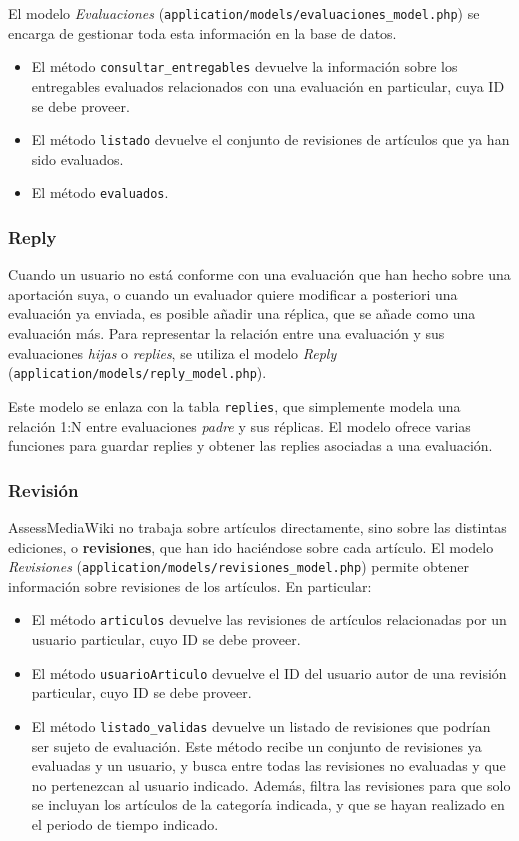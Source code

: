 \documentclass[11pt]{article}
\begin{document}
El modelo \textit{Evaluaciones}
(\texttt{application/models/evaluaciones\_model.php}) se encarga de gestionar
toda esta información en la base de datos. 

\begin{itemize}
\item El método \texttt{consultar\_entregables} devuelve la información sobre
  los entregables evaluados relacionados con una evaluación en particular, cuya
  ID se debe proveer.
\item El método \texttt{listado} devuelve el conjunto de revisiones de artículos
  que ya han sido evaluados.
\item El método \texttt{evaluados}.
\end{itemize}

\subsubsection{Reply}

Cuando un usuario no está conforme con una evaluación que han hecho sobre una
aportación suya, o cuando un evaluador quiere modificar a posteriori una
evaluación ya enviada, es posible añadir una réplica, que se añade como una
evaluación más. Para representar la relación entre una evaluación y sus
evaluaciones \textit{hijas} o \textit{replies}, se utiliza el modelo
\textit{Reply} (\texttt{application/models/reply\_model.php}).

Este modelo se enlaza con la tabla \texttt{replies}, que simplemente modela una
relación 1:N entre evaluaciones \textit{padre} y sus réplicas. El modelo ofrece
varias funciones para guardar replies y obtener las replies asociadas a una
evaluación.

\subsubsection{Revisión}

AssessMediaWiki no trabaja sobre artículos directamente, sino sobre las
distintas ediciones, o \textbf{revisiones}, que han ido haciéndose sobre cada
artículo. El modelo \textit{Revisiones}
(\texttt{application/models/revisiones\_model.php}) permite obtener información
sobre revisiones de los artículos. En particular:
\begin{itemize}
\item El método \texttt{articulos} devuelve las revisiones de artículos
  relacionadas por un usuario particular, cuyo ID se debe proveer.
\item El método \texttt{usuarioArticulo} devuelve el ID del usuario autor de una
  revisión particular, cuyo ID se debe proveer.
\item El método \texttt{listado\_validas} devuelve un listado de revisiones que
  podrían ser sujeto de evaluación. Este método recibe un conjunto de revisiones
  ya evaluadas y un usuario, y busca entre todas las revisiones no evaluadas y
  que no pertenezcan al usuario indicado. Además, filtra las revisiones para que
  solo se incluyan los artículos de la categoría indicada, y que se hayan
  realizado en el periodo de tiempo indicado.
\end{itemize}
\end{document}
